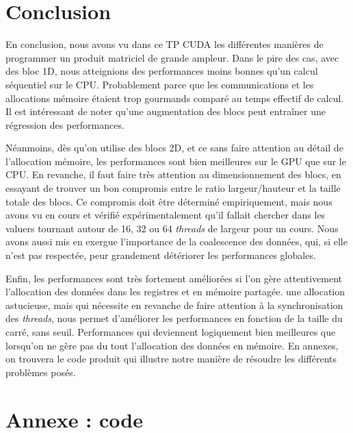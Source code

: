 \documentclass[	DIV=calc,%
							paper=a4,%
							fontsize=11pt%
							]{scrartcl}	 					%
\begin{document}
\section{Conclusion}
En conclusion, nous avons vu dans ce TP CUDA les différentes manières de programmer un produit matriciel de grande ampleur. Dans le pire des cas, avec des bloc 1D, nous atteignions des performances moins bonnes qu'un calcul séquentiel sur le CPU. Probablement parce que les communications et les allocations mémoire étaient trop gourmands comparé au temps effectif de calcul. Il est intéressant de noter qu'une augmentation des blocs peut entraîner une régression des performances.\par
Néanmoins, dès qu'on utilise des blocs 2D, et ce sans faire attention au détail de l'allocation mémoire, les performances sont bien meilleures sur le GPU que sur le CPU. En revanche, il faut faire très attention au dimensionnement des blocs, en essayant de trouver un bon compromis entre le ratio largeur/hauteur et la taille totale des blocs. Ce compromis doit être déterminé empiriquement, mais nous avons vu en cours et vérifié expérimentalement qu'il fallait chercher dans les valuers tournant autour de 16, 32 ou 64 \textit{threads} de largeur pour un cours. Nous avons aussi mis en exergue l'importance de la coalescence des données, qui, si elle n'est pas respectée, peur grandement détériorer les performances globales.\par
Enfin, les performances sont très fortement améliorées si l'on gère attentivement l'allocation des données dans les registres et en mémoire partagée. une allocation astucieuse, mais qui nécessite en revanche de faire attention à la synchronisation des \textit{threads}, nous permet d'améliorer les performances en fonction de la taille du carré, sans seuil. Performances qui deviennent logiquement bien meilleures que lorsqu'on ne gère pas du tout l'allocation des données en mémoire. En annexes, on trouvera le code produit qui illustre notre manière de résoudre les différents problèmes posés.
\newpage

\section{Annexe : code}
\end{document}
